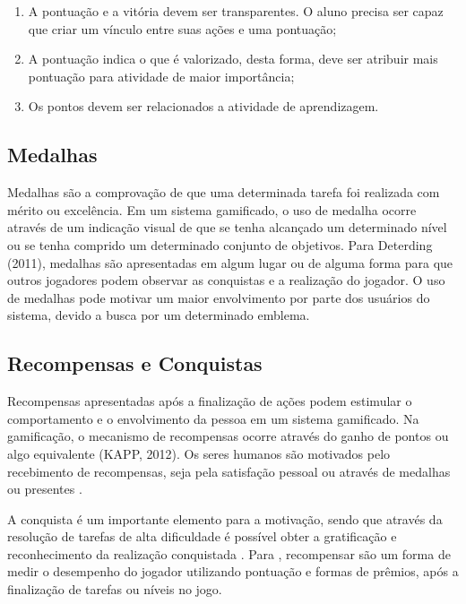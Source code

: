 \documentclass[
	12pt,				%
	oneside,			%
	a4paper,			%
	english,			%
	french,				%
	spanish,			%
	brazil,				%
	]{abntex2}
\begin{document}
\begin{enumerate}
\item A pontuação e a vitória devem ser transparentes. O aluno precisa ser capaz que criar um vínculo entre suas ações e uma pontuação;
\item A pontuação indica o que é valorizado, desta forma, deve ser atribuir mais pontuação para atividade de maior importância;
\item Os pontos devem ser relacionados a atividade de aprendizagem.
\end{enumerate}


\subsection{Medalhas}

Medalhas são a comprovação de que uma determinada tarefa foi realizada com mérito ou excelência. Em um sistema gamificado, o uso de medalha ocorre através de um indicação visual de que se tenha alcançado um determinado nível ou se tenha comprido um determinado conjunto de objetivos. Para Deterding (2011), medalhas são apresentadas em algum lugar ou de alguma forma para que outros jogadores podem observar as conquistas e a realização do jogador. O uso de medalhas pode motivar um maior envolvimento por parte dos usuários do sistema, devido a busca por um determinado emblema.
    
\subsection{Recompensas e Conquistas}    

Recompensas apresentadas após a finalização de ações podem estimular o comportamento e o envolvimento da pessoa em um sistema gamificado. Na gamificação, o mecanismo de recompensas ocorre através do ganho de pontos ou algo equivalente (KAPP, 2012). Os seres humanos são motivados pelo recebimento de recompensas, seja pela satisfação pessoal ou através de medalhas ou presentes \cite{quadros2016gamificaccao}.

A conquista é um importante elemento para a motivação, sendo que através da resolução de tarefas de alta dificuldade é possível obter a gratificação e reconhecimento da realização conquistada \cite{quadros2016gamificaccao}. Para \citet{busarello2016gamificaccao}, recompensar são um forma de medir o desempenho do jogador utilizando pontuação e formas de prêmios, após a finalização de tarefas ou níveis no jogo.
\end{document}
